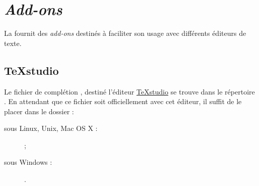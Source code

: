 \chapter{\emph{Add-ons}}\label{cha:add-ons}

La \yatcl{} fournit des \emph{add-ons} destinés à faciliter son usage avec
différents éditeurs de texte.

\section{TeXstudio}
\label{sec:texstudio}

Le fichier de complétion , destiné l'éditeur
\href{http://texstudio.sourceforge.net/}{TeXstudio} se trouve dans le
répertoire . En attendant
que ce fichier soit officiellement avec cet éditeur, il suffit de le placer
dans le dossier :
\begin{description}
\item[sous Linux, Unix, Mac OS X :]  ;
\item[sous Windows :] .
\end{description}

%
\iffalse
\fi
